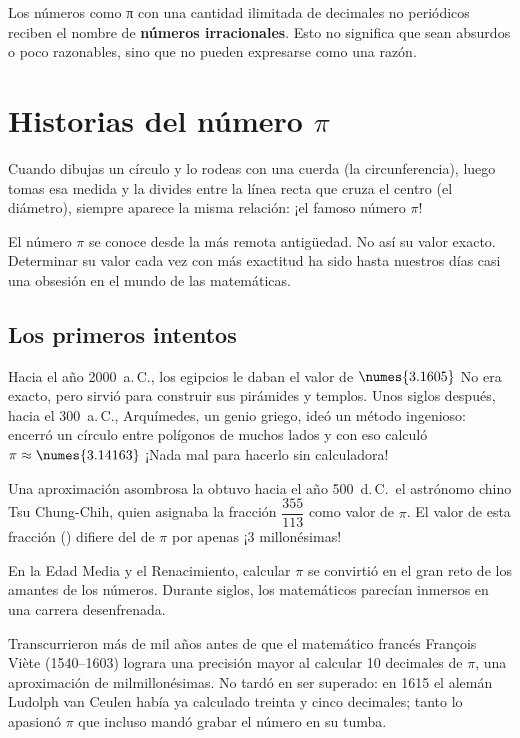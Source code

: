 Los números como π con una cantidad ilimitada de decimales no periódicos reciben el nombre de \textbf{números irracionales}. 
Esto no significa que sean absurdos o poco razonables, sino que no pueden expresarse como una razón.

\section*{Historias del número \texorpdfstring{$\pi$}{pi}}
Cuando dibujas un círculo y lo rodeas con una cuerda (la circunferencia), luego tomas esa medida y la divides 
entre la línea recta que cruza el centro (el diámetro), siempre aparece la misma relación: ¡el famoso número $\pi$!

El número $\pi$ se conoce desde la más remota antigüedad. No así su valor exacto. Determinar su valor cada vez 
con más exactitud ha sido hasta nuestros días casi una obsesión en el mundo de las matemáticas.

\subsection*{Los primeros intentos}
Hacia el año 2000~a.\,C., los egipcios le daban el valor de $\numes{3.1605}$ 
No era exacto, pero sirvió para construir sus pirámides y templos. Unos siglos después, hacia el 300~a.\,C., 
Arquímedes, un genio griego, ideó un método ingenioso: encerró un círculo entre polígonos de muchos lados 
y con eso calculó $\pi \approx \numes{3.14163}$ ¡Nada mal para hacerlo sin calculadora!

Una aproximación asombrosa la obtuvo hacia el año 500~d.\,C.\ el astrónomo chino 
Tsu Ch\textquotesingle ung-Chih, quien asignaba la fracción $\dfrac{355}{113}$ como valor de $\pi$. 
El valor de esta fracción () difiere del de $\pi$ por apenas ¡3 millonésimas!

En la Edad Media y el Renacimiento, calcular $\pi$ se convirtió en el gran reto de los amantes 
de los números. Durante siglos, los matemáticos parecían inmersos en una carrera desenfrenada.

Transcurrieron más de mil años antes de que el matemático francés Fran\c{c}ois Vi\`ete (1540--1603) lograra una precisión mayor 
al calcular 10 decimales de $\pi$, una aproximación de milmillonésimas. 
No tardó en ser superado: en 1615 el alemán Ludolph van Ceulen había ya calculado treinta y cinco decimales; tanto lo 
apasionó $\pi$ que incluso mandó grabar el número en su tumba.

